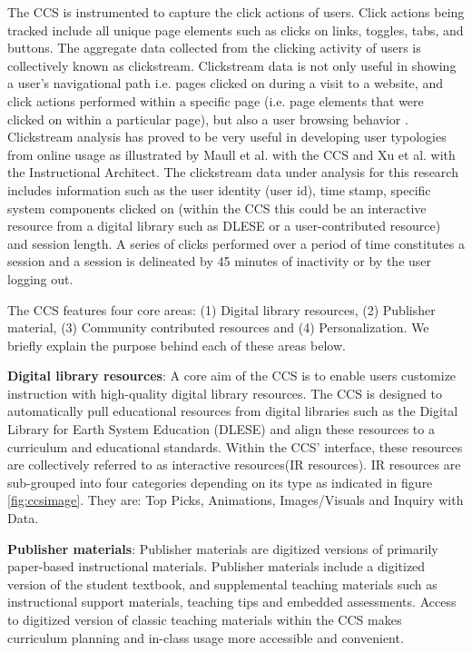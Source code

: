 \documentclass{acm_proc_article-sp}
\begin{document}
The CCS is instrumented to capture the click actions of users. Click actions being tracked include all unique page elements such as clicks on links, toggles, tabs, and buttons. The aggregate data collected from the clicking activity of users is collectively known as clickstream. Clickstream data is not only useful in showing a user's navigational path i.e. pages clicked on during a visit to a website, and click actions performed within a specific page (i.e. page elements that were clicked on within a particular page), but also a user browsing behavior \cite{montgomery2004modeling}. Clickstream analysis has proved to be very useful in developing user typologies from online usage as illustrated by Maull et al. \cite{maullunderstanding} with the CCS and Xu et al.\cite{xu} with the Instructional Architect. The clickstream data under analysis for this research includes information such as the user identity (user id), time stamp, specific system components clicked on (within the CCS this could be an interactive resource from a digital library such as DLESE or a user-contributed resource) and session length. A series of clicks performed over a period of time constitutes a session and a session is delineated by 45 minutes of inactivity or by the user logging out.

The CCS features four core areas: (1) Digital library resources, (2) Publisher material, (3) Community contributed resources and (4) Personalization. We briefly explain the purpose behind each of these areas below.
 
\textbf{Digital library resources}:
A core aim of the CCS is to enable users customize instruction with high-quality digital library resources. The CCS is designed to automatically pull educational resources from digital libraries such as the Digital Library for Earth System Education (DLESE) and align these resources to a curriculum and educational standards. Within the CCS' interface, these resources are collectively referred to as interactive resources(IR resources). IR resources are sub-grouped into four categories depending on its type as indicated in figure \ref{fig:ccsimage}. They are: Top Picks, Animations, Images/Visuals and Inquiry with Data. 

\textbf{Publisher materials}:
Publisher materials are digitized versions of primarily paper-based instructional materials. Publisher materials include a digitized version of the student textbook, and supplemental teaching materials such as instructional support materials, teaching tips and embedded assessments. Access to digitized version of classic teaching materials within the CCS makes curriculum planning and in-class usage more accessible and convenient.
\end{document}
